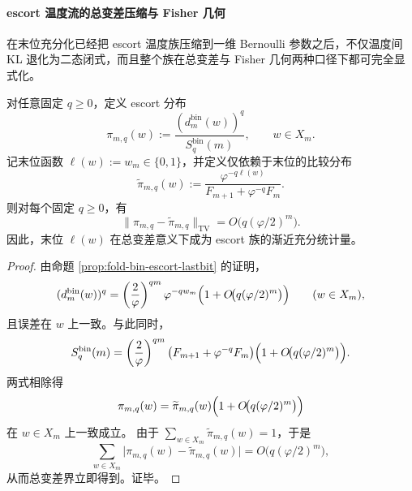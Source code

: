 \paragraph{escort 温度流的总变差压缩与 Fisher 几何}
在末位充分化已经把 escort 温度族压缩到一维 Bernoulli 参数之后，不仅温度间 KL 退化为二态闭式，而且整个族在总变差与 Fisher 几何两种口径下都可完全显式化。

\begin{theorem}\label{thm:xi-foldbin-escort-tv-collapse-onebit-gibbs}
对任意固定 \(q\ge 0\)，定义 escort 分布
\[
\pi_{m,q}(w):=\frac{(d_m^{\mathrm{bin}}(w))^q}{S_q^{\mathrm{bin}}(m)},
\qquad
w\in X_m.
\]
记末位函数 \(\ell(w):=w_m\in\{0,1\}\)，并定义仅依赖于末位的比较分布
\[
\widetilde\pi_{m,q}(w):=
\frac{\varphi^{-q\ell(w)}}{F_{m+1}+\varphi^{-q}F_m}.
\]
则对每个固定 \(q\ge 0\)，有
\[
\|\pi_{m,q}-\widetilde\pi_{m,q}\|_{\mathrm{TV}}
=
O\!\bigl(q(\varphi/2)^m\bigr).
\]
因此，末位 \(\ell(w)\) 在总变差意义下成为 escort 族的渐近充分统计量。
\end{theorem}
\begin{proof}
由命题 \ref{prop:fold-bin-escort-lastbit} 的证明，
\[
(d_m^{\mathrm{bin}}(w))^q
=
\left(\frac{2}{\varphi}\right)^{qm}\varphi^{-q w_m}
\Bigl(1+O\!\bigl(q(\varphi/2)^m\bigr)\Bigr)
\qquad(w\in X_m),
\]
且误差在 \(w\) 上一致。与此同时，
\[
S_q^{\mathrm{bin}}(m)
=
\left(\frac{2}{\varphi}\right)^{qm}
\bigl(F_{m+1}+\varphi^{-q}F_m\bigr)
\Bigl(1+O\!\bigl(q(\varphi/2)^m\bigr)\Bigr).
\]
两式相除得
\[
\pi_{m,q}(w)=\widetilde\pi_{m,q}(w)\Bigl(1+O\!\bigl(q(\varphi/2)^m\bigr)\Bigr)
\]
在 \(w\in X_m\) 上一致成立。
由于 \(\sum_{w\in X_m}\widetilde\pi_{m,q}(w)=1\)，于是
\[
\sum_{w\in X_m}\bigl|\pi_{m,q}(w)-\widetilde\pi_{m,q}(w)\bigr|
=
O\!\bigl(q(\varphi/2)^m\bigr),
\]
从而总变差界立即得到。证毕。
\end{proof}

